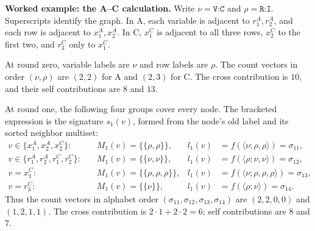 \documentclass[10pt]{article}
\begin{document}
\medskip
\textbf{Worked example: the A--C calculation.}
Write $\nu=\texttt{V:C}$ and $\rho=\texttt{R:I}$.
Superscripts identify the graph. In A, each variable is adjacent to
$r_1^A,r_2^A$, and each row is adjacent to $x_1^A,x_2^A$.
In C, $x_1^C$ is adjacent to all three rows, $x_2^C$ to the first two,
and $r_3^C$ only to $x_1^C$.

At round zero, variable labels are $\nu$ and row labels are $\rho$.
The count vectors in order $(\nu,\rho)$ are $(2,2)$ for A and
$(2,3)$ for C. The cross contribution is $10$, and their self
contributions are $8$ and $13$.

At round one, the following four groups cover every node.
The bracketed expression is the signature $s_1(v)$, formed from
the node's old label and its sorted neighbor multiset:
\[
\begin{aligned}
v\in\{x_1^A,x_2^A,x_2^C\}:&
\quad M_1(v)=\{\!\{\rho,\rho\}\!\},&
l_1(v)&=f(\langle\nu;\rho,\rho\rangle)=\sigma_{11},\\
v\in\{r_1^A,r_2^A,r_1^C,r_2^C\}:&
\quad M_1(v)=\{\!\{\nu,\nu\}\!\},&
l_1(v)&=f(\langle\rho;\nu,\nu\rangle)=\sigma_{12},\\
v=x_1^C:&
\quad M_1(v)=\{\!\{\rho,\rho,\rho\}\!\},&
l_1(v)&=f(\langle\nu;\rho,\rho,\rho\rangle)=\sigma_{13},\\
v=r_3^C:&
\quad M_1(v)=\{\!\{\nu\}\!\},&
l_1(v)&=f(\langle\rho;\nu\rangle)=\sigma_{14}.
\end{aligned}
\]
Thus the count vectors in alphabet order
$(\sigma_{11},\sigma_{12},\sigma_{13},\sigma_{14})$ are
$(2,2,0,0)$ and $(1,2,1,1)$.
The cross contribution is $2\cdot1+2\cdot2=6$;
self contributions are $8$ and $7$.
\end{document}
